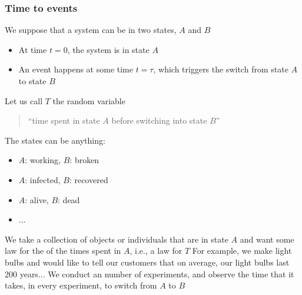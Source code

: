 \documentclass[aspectratio=169]{beamer}
\begin{document}
\begin{frame}\frametitle{Time to events}
We suppose that a system can be in two states, $A$ and $B$
\begin{itemize}
\item At time $t=0$, the system is in state $A$
\item An event happens at some time $t=\tau$, which triggers the switch from
state $A$ to state $B$
\end{itemize}
\vfill
Let us call $T$ the random variable 
\begin{quote}
``time spent in state $A$ before switching into state $B$''
\end{quote}
\end{frame}

\begin{frame}
The states can be anything:
\begin{itemize}
\item $A$: working, $B$: broken
\item $A$: infected, $B$: recovered
\item $A$: alive, $B$: dead
\item $\ldots$
\end{itemize}
\vfill
We take a collection of objects or individuals that are in state $A$ and want
some law for the  of the times spent in $A$, i.e., a law for $T$
\vfill
For example, we make light bulbs and would like to tell our customers that on average, our light bulbs last 200 years...
\vfill
We conduct an  number of experiments, and observe the time that it takes, in every experiment, to switch from $A$ to $B$
\end{frame}
\end{document}
